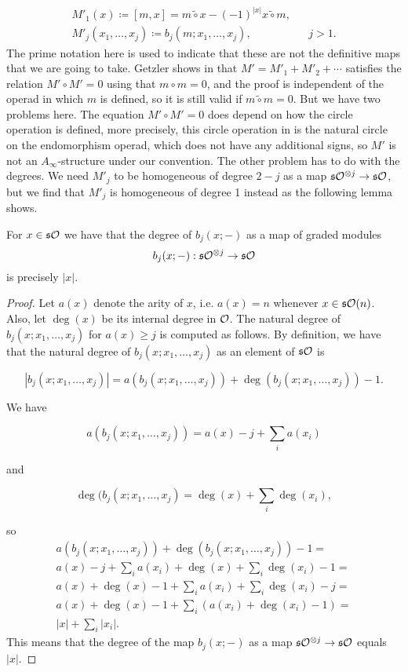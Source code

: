 \documentclass[join.tex]{subfiles}
\begin{document}
\begin{align*}
M'_1(x)\coloneqq [m,x]=m\tilde{\circ} x-(-1)^{|x|}x\tilde{\circ}m, & &  \\
M'_j(x_1,\dots, x_j)\coloneqq b_j(m;x_1,\dots, x_j),& &j>1.
\end{align*}
The prime notation here is used to indicate that these are not the definitive maps that we are going to take. Getzler shows in \cite{getzler} that $M'=M'_1+M'_2+\cdots$ satisfies the relation $M'\circ M'=0$ using that $m\circ m=0$, and the proof is independent of the operad in which $m$ is defined, so it is still valid if $m\tilde{\circ}m=0$. But we have two problems here. The equation $M'\circ M'=0$ does depend on how the circle operation is defined, more precisely, this circle operation in \cite{getzler} is the natural circle on the endomorphism operad, which does not have any additional signs, so $M'$ is not an $A_\infty$-structure under our convention. The other problem has to do with the degrees. We need $M'_j$ to be homogeneous of degree $2-j$ as a map $\mathfrak{s}{\mathcal O}^{\otimes j}\to \mathfrak{s}{\mathcal O}$, but we find that $M'_j$ is homogeneous of degree 1 instead as the following lemma shows.
\begin{lem}\label{lemmadegree}
For $x\in\mathfrak{s}{\mathcal O}$ we have that  the degree of $b_j(x;-)$ as a map of graded modules \[b_j(x;-):\mathfrak{s}{\mathcal O}^{\otimes j}\to\mathfrak{s}{\mathcal O}\] is precisely $|x|$.
\end{lem}
\begin{proof}
Let $a(x)$ denote the arity of $x$, i.e. $a(x)=n$ whenever $x\in\mathfrak{s}{\mathcal O}(n)$. Also, let $\deg(x)$ be its internal degree in ${\mathcal O}$. The natural degree of $b_j(x;x_1,\dots,x_j)$ for $a(x)\geq j$ is computed as follows. By definition, we have that the natural degree of $b_j(x;x_1,\dots,x_j)$ as an element of $\mathfrak{s}{\mathcal O}$ is

\[|b_j(x;x_1,\dots,x_j)|=a(b_j(x;x_1,\dots,x_j))+\deg(b_j(x;x_1,\dots,x_j))-1.\]

We have 

\[a(b_j(x;x_1,\dots,x_j))=a(x)-j+\sum_i a(x_i)\]

and 

\[\deg(b_j(x;x_1,\dots,x_j)=\deg(x)+\sum_i\deg(x_i),\]

so 
\begin{align*}
a(b_j(x;x_1,\dots,x_j))+\deg(b_j(x;x_1,\dots,x_j))-1=\\
a(x)-j+\sum_i a(x_i)+\deg(x)+\sum_i\deg(x_i)-1=\\
a(x)+\deg(x)-1+\sum_i a(x_i)+\sum_i\deg(x_i)-j=\\
a(x)+\deg(x)-1+\sum_i (a(x_i)+\deg(x_i)-1)=\\
|x|+\sum_i|x_i|.
\end{align*}
This means that the degree of the map $b_j(x;-)$ as a map $\mathfrak{s}{\mathcal O}^{\otimes j}\to \mathfrak{s}{\mathcal O}$ equals $|x|$.

\end{proof} %
\end{document}
